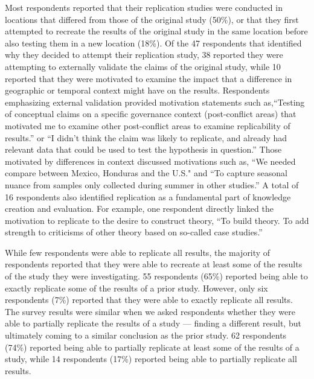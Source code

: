 \documentclass[]{interact}
\theoremstyle{plain}%
\theoremstyle{definition}
\theoremstyle{remark}
\begin{document}
Most respondents reported that their replication studies were conducted in locations that differed from those of the original study (50\%), or that they first attempted to recreate the results of the original study in the same location before also testing them in a new location (18\%). 
Of the 47 respondents that identified why they decided to attempt their replication study, 38 reported they were attempting to externally validate the claims of the original study, while 10 reported that they were motivated to examine the impact that a difference in geographic or temporal context might have on the results. 
Respondents emphasizing external validation provided motivation statements such as,``Testing of conceptual claims on a specific governance context (post-conflict areas) that motivated me to examine other post-conflict areas to examine replicability of results.'' or ``I didn't think the claim was likely to replicate, and already had relevant data that could be used to test the hypothesis in question.''
Those motivated by differences in context discussed motivations such as, ``We needed compare between Mexico, Honduras and the U.S." and ``To capture seasonal nuance from samples only collected during summer in other studies.''
A total of 16 respondents also identified replication as a fundamental part of knowledge creation and evaluation. 
For example, one respondent directly linked the motivation to replicate to the desire to construct theory, ``To build theory. To add strength to criticisms of other theory based on so-called case studies.''

While few respondents were able to replicate all results, the majority of respondents reported that they were able to recreate at least some of the results of the study they were investigating. 
55 respondents (65\%) reported being able to exactly replicate some of the results of a prior study. 
However, only six respondents (7\%) reported that they were able to exactly replicate all results.
The survey results were similar when we asked respondents whether they were able to partially replicate the results of a study --- finding a different result, but ultimately coming to a similar conclusion as the prior study. 
62 respondents (74\%) reported being able to partially replicate at least some of the results of a study, while 14 respondents (17\%) reported being able to partially replicate all results. 
\end{document}
